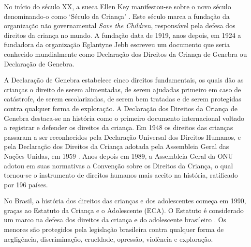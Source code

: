 No início do século XX, a sueca Ellen Key manifestou-se sobre o novo século denominando-o como `Século da Criança' \cite{sandin1999imagens, dos2015olhares, hayes2002children}. Este século marca a fundação da organização não governamental \textit{Save the Children}, responsável pela defesa dos direitos da criança no mundo. A fundação data de 1919, anos depois, em 1924 a fundadora da organização Eglantyne Jebb escreveu um documento que seria conhecido mundialmente como Declaração dos Direitos da Criança de Genebra ou Declaração de Genebra.

A Declaração de Genebra estabelece cinco direitos fundamentais, os quais dão as crianças o direito de serem alimentadas, de serem ajudadas primeiro em caso de catástrofe, de serem escolarizadas, de serem bem tratadas e de serem protegidas contra qualquer forma de exploração. A Declaração dos Direitos da Criança de Genebra destaca-se na história como o primeiro documento internacional voltado a registrar e defender os direitos da criança. Em 1948 os direitos das crianças passaram a ser reconhecidos pela Declaração Universal dos Direitos Humanos, e pela Declaração dos Direitos da Criança adotada pela Assembleia Geral das Nações Unidas, em 1959 \cite{lelis2014fragmentaccao}. Anos depois em 1989, a Assembleia Geral da ONU adotou em suas normativas a Convenção sobre os Direitos da Criança, o qual tornou-se o instrumento de direitos humanos mais aceito na história, ratificado por 196 países. 


No Brasil, a história dos direitos das crianças e dos adolescentes começa em 1990, graças ao Estatuto da Criança e o Adolescente (ECA). O Estatuto é considerado um marco na defesa dos direitos da criança e do adolescente brasileiro \cite{lima2012direitos}. Os menores são protegidos pela legislação brasileira contra qualquer forma de negligência, discriminação, crueldade, opressão, violência e exploração. 

